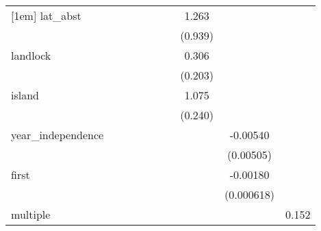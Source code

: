 {\begin{tabular}{l*{9}{c}}
[1em]
lat\_abst    &                     &                     &                     &                     &                     &                     &       1.263         &                     &                     \\
            &                     &                     &                     &                     &                     &                     &     (0.939)         &                     &                     \\
[1em]
landlock    &                     &                     &                     &                     &                     &                     &       0.306         &                     &                     \\
            &                     &                     &                     &                     &                     &                     &     (0.203)         &                     &                     \\
[1em]
island      &                     &                     &                     &                     &                     &                     &       1.075\sym{***}&                     &                     \\
            &                     &                     &                     &                     &                     &                     &     (0.240)         &                     &                     \\
[1em]
year\_independence&                     &                     &                     &                     &                     &                     &                     &    -0.00540         &                     \\
            &                     &                     &                     &                     &                     &                     &                     &   (0.00505)         &                     \\
[1em]
first       &                     &                     &                     &                     &                     &                     &                     &    -0.00180\sym{***}&                     \\
            &                     &                     &                     &                     &                     &                     &                     &  (0.000618)         &                     \\
[1em]
multiple    &                     &                     &                     &                     &                     &                     &                     &                     &       0.152         \\

\end{tabular}}
